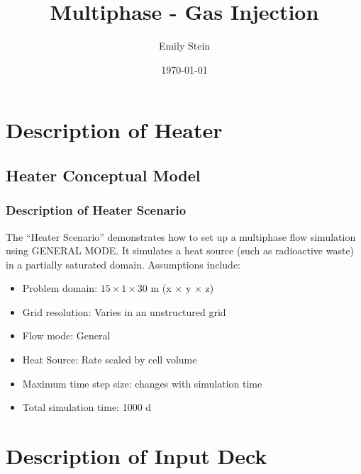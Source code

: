 \documentclass{beamer}
\begin{document}
\title{Multiphase - Gas Injection}
\author{Emily Stein}
\date{\today}


\section{Description of Heater}

\subsection{Heater Conceptual Model}

\begin{frame}\frametitle{Description of Heater Scenario}
The ``Heater Scenario'' demonstrates how to set up a multiphase flow simulation using GENERAL MODE. It simulates a heat source (such as radioactive waste) in a partially saturated domain. Assumptions include:
\begin{itemize}
  \item Problem domain: $15 \times 1 \times 30$ m (x $\times$ y $\times$ z)
  \item Grid resolution: Varies in an unstructured grid
  \item Flow mode: General
  \item Heat Source: Rate scaled by cell volume
  \item Maximum time step size: changes with simulation time
  \item Total simulation time: 1000 d
\end{itemize}

\end{frame}



\section{Description of Input Deck}

\end{document}

